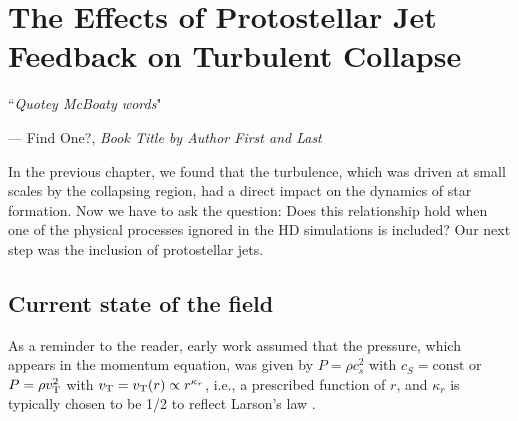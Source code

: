 \documentclass[../dissertation.tex]{subfiles}
\begin{document}
\chapter[Jet Feedback in Star Formation]{The Effects of Protostellar Jet Feedback on Turbulent Collapse}
\label{ch:jet}


\singlespace
\epigraph{``\emph{Quotey McBoaty words}"}{--- \textup{Find One?}, \textit{Book Title by Author First and Last}}

\dblspace

%

In the previous chapter, we found that the turbulence, which was driven at small scales by the collapsing region, had a direct impact on the dynamics of star formation.
Now we have to ask the question: Does this relationship hold when one of the physical processes ignored in the HD simulations is included? 
Our next step was the inclusion of protostellar jets. 




\section{Current state of the field}
As a reminder to the reader, early work \citep{1977ApJ...214..488S,1992ApJ...396..631M,1997ApJ...476..750M} assumed that the pressure, which appears in the momentum equation, was given by $P = \rho c_s^2$ with $c_S = \textrm{const}$ or $P = \rho v_{\rm T}^2$ with $v_{\rm T} = v_{\rm T}(r) \propto r^{\kappa_r}$, i.e., a prescribed function of $r$, and $\kappa_r$ is typically chosen to be 1/2 to reflect Larson's law \citep{1981MNRAS.194..809L}.
\end{document}
